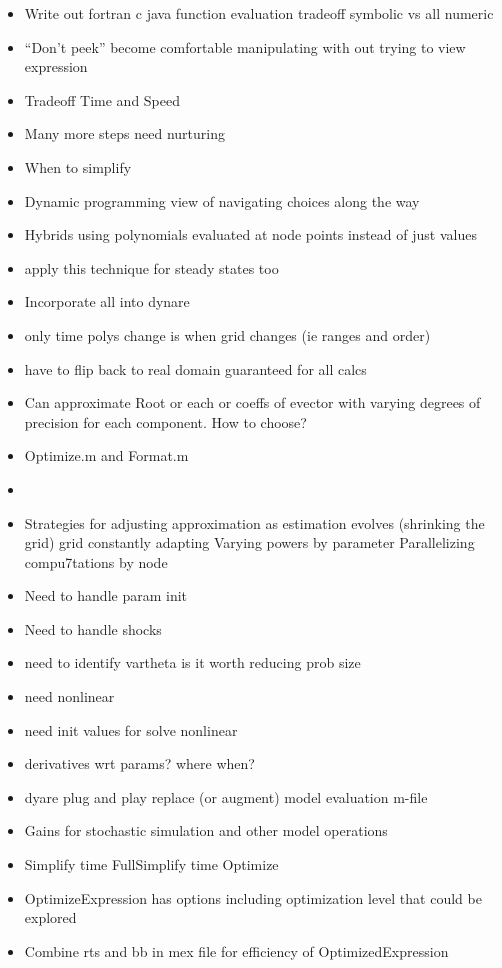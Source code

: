 \documentclass[12pt]{elsart}
\begin{document}
\begin{itemize}
\item Write out fortran c java function evaluation tradeoff symbolic vs all numeric
\item ``Don't peek'' become comfortable manipulating with out trying to view expression
\item Tradeoff Time and Speed
\item Many more steps need nurturing
\item When to simplify
\item Dynamic programming view of navigating choices along the way
\item Hybrids using polynomials evaluated at node points instead of just values
\item apply this technique for steady states too
\item Incorporate all into dynare
\item only time polys change is when grid changes (ie ranges and order)
\item have to flip back to real domain guaranteed for all calcs
\item Can approximate Root or each or coeffs of evector with varying degrees of precision for each component. How to choose?
\item Optimize.m\cite{sofroniou04} and Format.m\cite{sofroniou04a}
\item \cite{bhandari10}
\item Strategies for adjusting approximation as estimation evolves (shrinking the grid) grid constantly adapting Varying powers by parameter Parallelizing compu7tations by node
\item Need to handle param init
\item Need to handle shocks
\item need to identify vartheta is it worth reducing prob size
\item need nonlinear
\item need init values for solve  nonlinear
\item derivatives wrt params? where when?
\item dyare plug and play replace (or augment) model evaluation m-file
\item Gains for stochastic simulation and other model operations
\item Simplify time  FullSimplify time Optimize
\item OptimizeExpression has options including optimization level that could be explored
\item Combine rts and bb in mex file for efficiency of OptimizedExpression

\end{itemize}
\end{document}

